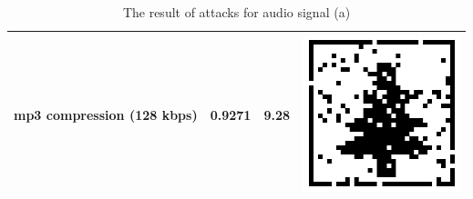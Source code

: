 \documentclass[12pt,a4paper]{report}
\begin{document}
\begin{table}[h!]
\begin{tabular} {|c|c|c|c|}
  \hline
 mp3 compression (128 kbps) & 0.9271 & 9.28 & \includegraphics[scale=.4]{image/citizen(128).png} \\
 \hline
 \end{tabular}
 \newline
 \caption{The result of attacks for audio signal (a)}
 \label{table:soundone}
\end{table}
\end{document}
